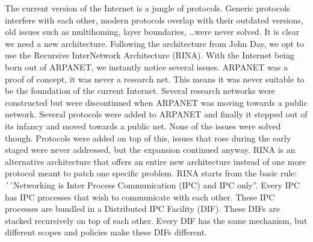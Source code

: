 \begin{slshape}



The current version of the Internet is a jungle of protocols. Generic protocols interfere with each other, modern protocols overlap with their outdated versions, old issues such as multihoming, layer boundaries, \ldots were never solved. It is clear we need a new architecture. Following the architecture from John Day, we opt to use the Recursive InterNetwork Architecture (RINA). 
\npar
With the Internet being born out of ARPANET, we instantly notice several issues. ARPANET was a proof of concept, it was never a research net. This means it was never suitable to be the foundation of the current Internet. Several research networks were constructed but were discontinued when ARPANET was moving towards a public network. Several protocols were added to ARPANET and finally it stepped out of its infancy and moved towards a public net. None of the issues were solved though. Protocols were added on top of this, issues that rose during the early staged were never addressed, but the expansion continued anyway. RINA is an alternative architecture that offers an entire new architecture instead of one more protocol meant to patch one specific problem. RINA starts from the basic rule: ´´Networking is Inter Process Communication (IPC) and IPC only''. Every IPC has IPC processes that wish to communicate with each other. These IPC processes are bundled in a Distributed IPC Facility (DIF). These DIFs are stacked recursively on top of each other. Every DIF has the same mechanism, but different scopes and policies make these DIFs different. 

\npar


\end{slshape}
